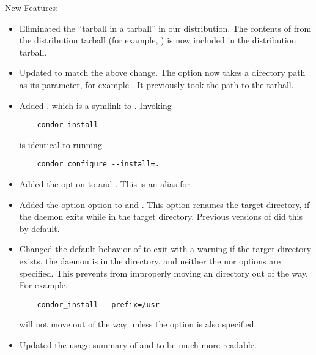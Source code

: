\noindent New Features:

\begin{itemize}

\item Eliminated the ``tarball in a tarball'' in our distribution.
  The contents of  from the distribution tarball
  (for example, ) is now
  included in the distribution tarball.

\item Updated  to match the above change.  The
   option now takes a directory path as its parameter,
  for example .
  It previously took the path to
  the  tarball.

\item Added , which is a symlink to .
  Invoking 
\begin{verbatim}
    condor_install
\end{verbatim}
  is identical to running
\begin{verbatim}
    condor_configure --install=.
\end{verbatim}

\item Added the option  to  and
  .  This is an alias for .

\item Added the option  option to  and
  .  This option renames the target  directory,
  if the  daemon exits while in the target  directory.
  Previous versions of  did this by default.

\item Changed the default behavior of  to exit with a
  warning if the target  directory exists,
  the  daemon is in the  directory,
  and neither the  nor  options are specified.
  This prevents  from improperly moving an 
  directory out of the way.
  For example,
\begin{verbatim}
    condor_install --prefix=/usr
\end{verbatim}
  will not move  out of the way unless
  the  option is also specified.

\item Updated the usage summary of  and
   to be much more readable.

\end{itemize}

